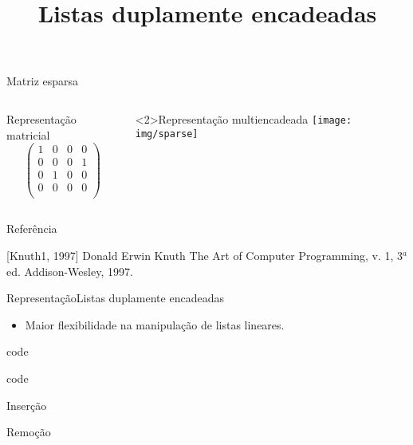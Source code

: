 \begin{frame}{Matriz esparsa}

\begin{columns}
\begin{column}{.4\textwidth}
\begin{block}{Representação matricial}
\[
\left(
\begin{matrix}
1 & 0 & 0 & 0 \\
0 & 0 & 0 & 1 \\
0 & 1 & 0 & 0 \\
0 & 0 & 0 & 0 \\
\end{matrix}
\right)
\]
\end{block}
\end{column}
\begin{column}{.6\textwidth}
\begin{block}<2>{Representação multiencadeada}
\texttt{[image: img/sparse]}
\end{block}
\end{column}
\end{columns}


\end{frame}

\begin{frame}{Referência}
\begin{thebibliography}{4}

[Knuth1, 1997]
Donald Erwin Knuth
\newblock The Art of Computer Programming, v. 1, 3$^a$ ed.
\newblock Addison-Wesley, 1997.
\end{thebibliography}
\end{frame}


\title{Listas duplamente encadeadas}


\frame{\maketitle}

\begin{frame}{Representação}{Listas duplamente encadeadas}

\begin{itemize}
\item Maior flexibilidade na manipulação de listas lineares.
\end{itemize}

\begin{center}
%
code
\end{center}

\begin{center}
%
code
\end{center}

\end{frame}

\begin{frame}{Inserção}
\end{frame}


\begin{frame}{Remoção}
\end{frame}


